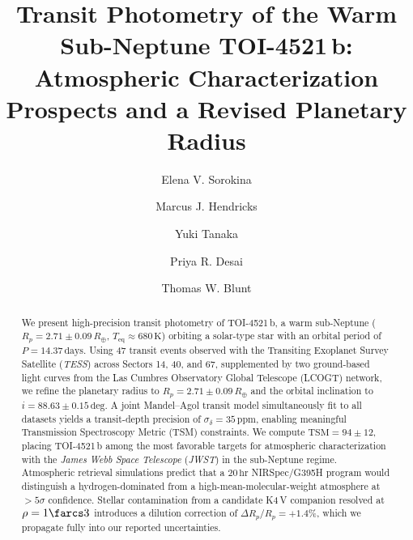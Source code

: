 \documentclass[twocolumn]{aastex631}
\begin{document}
\title{Transit Photometry of the Warm Sub-Neptune TOI-4521\,b:
       Atmospheric Characterization Prospects and a
       Revised Planetary Radius}

\author{Elena V. Sorokina}

\author{Marcus J. Hendricks}

\author{Yuki Tanaka}

\author{Priya R. Desai}

\author{Thomas W. Blunt}


\begin{abstract}
We present high-precision transit photometry of TOI-4521\,b, a warm
sub-Neptune ($R_p = 2.71 \pm 0.09\,R_\oplus$, $T_\mathrm{eq} \approx
680\,\mathrm{K}$) orbiting a solar-type star with an orbital period of
$P = 14.37\,\mathrm{days}$.  Using 47 transit events observed with the
Transiting Exoplanet Survey Satellite (\textit{TESS}) across Sectors 14,
40, and 67, supplemented by two ground-based light curves from the
Las Cumbres Observatory Global Telescope (LCOGT) network, we refine the
planetary radius to $R_p = 2.71 \pm 0.09\,R_\oplus$ and the orbital
inclination to $i = 88.63 \pm 0.15\,\mathrm{deg}$.  A joint
Mandel--Agol transit model simultaneously fit to all datasets yields a
transit-depth precision of $\sigma_\delta = 35\,\mathrm{ppm}$, enabling
meaningful Transmission Spectroscopy Metric (TSM) constraints.  We
compute $\mathrm{TSM} = 94 \pm 12$, placing TOI-4521\,b among the most
favorable targets for atmospheric characterization with the
\textit{James Webb Space Telescope} (\textit{JWST}) in the sub-Neptune
regime.  Atmospheric retrieval simulations predict that a $20\,\mathrm{hr}$
NIRSpec/G395H program would distinguish a hydrogen-dominated from a
high-mean-molecular-weight atmosphere at $>5\sigma$ confidence.
Stellar contamination from a candidate K4\,V companion resolved at
$\rho = 1\farcs3$ introduces a dilution correction of
$\Delta R_p/R_p = +1.4\%$, which we propagate fully into our reported
uncertainties.
\end{abstract}
\end{document}
